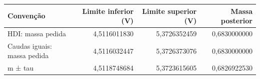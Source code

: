 \begin{tabular}{lrrr}
\toprule
Convenção & Limite inferior (V) & Limite superior (V) & Massa posterior \\
\midrule
HDI: massa pedida & 4,5116011830 & 5,3726352459 & 0,6830000000 \\
Caudas iguais: massa pedida & 4,5116032447 & 5,3726373076 & 0,6830000000 \\
m ± tau & 4,5118748684 & 5,3723615605 & 0,6826922530 \\
\bottomrule
\end{tabular}
